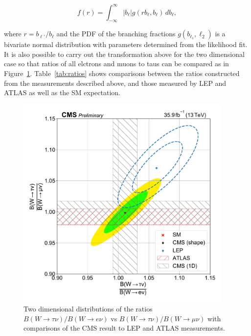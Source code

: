 \begin{equation}
    f(r) = \int_{-\infty}^{\infty} \left|b_{\ell}\right| g(r b_{\ell}, b_{\ell}) \,db_{\ell},
\end{equation}

where $r = b_{\ell'}/b_{\ell}$ and the PDF of the branching fractions
$g(b_{\ell_{1}}, \ell_{2})$ is a bivariate normal distribution with parameters
determined from the likelihood fit.  It is also possible to carry out the
transformation above for the two dimensional case so that ratios of all
elctrons and muons to taus can be compared as in Figure~\ref{fig:ratios_2D}.
Table~\ref{tab:ratios} shows comparisons between the ratios constructed from
the measurements described above, and those measured by LEP and ATLAS as well
as the SM expectation. 

\begin{figure}[htb!]
    \begin{center}
    \includegraphics[width=0.95\textwidth]{chapters/Analysis/sectionResult/figures/result_contours_2d_ratio.pdf}
    \caption{Two dimensional distributions of the ratios $B(W\rightarrow
    \tau\nu)/B(W\rightarrow e\nu)$ vs $B(W\rightarrow \tau\nu)/B(W\rightarrow \mu\nu)$ 
    with comparisons of the CMS result to LEP and ATLAS measurements.}
    \label{fig:ratios_2D}
    \end{center}
\end{figure}

